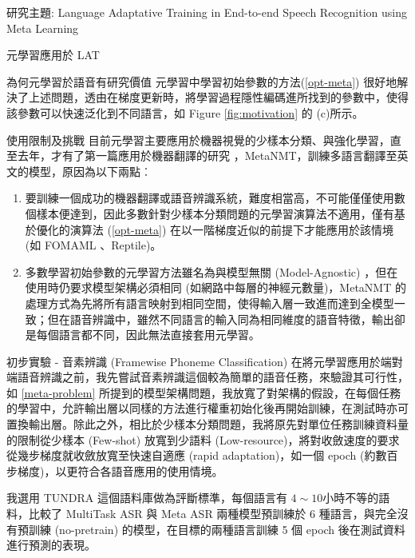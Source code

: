 \documentclass[12pt,UTF8,fntef]{article}
\begin{document}
\begin{section}{研究主題: Language Adaptative Training in End-to-end Speech Recognition using Meta Learning}
\begin{subsection}{元學習應用於 LAT}
\begin{subsubsection}{為何元學習於語音有研究價值}
      元學習中學習初始參數的方法(\ref{opt-meta}) 很好地解決了上述問題，透由在梯度更新時，將學習過程隱性編碼進所找到的參數中，使得該參數可以快速泛化到不同語言，如 Figure \ref{fig:motivation} 的 (c)所示。
    \end{subsubsection}
    \begin{subsubsection}{使用限制及挑戰} \label{meta-problem}
      目前元學習主要應用於機器視覺的少樣本分類、與強化學習，直至去年，才有了第一篇應用於機器翻譯的研究 \cite{gu2018meta}，MetaNMT，訓練多語言翻譯至英文的模型，原因為以下兩點︰
      \begin{enumerate}[itemsep=-1mm]
        \item 要訓練一個成功的機器翻譯或語音辨識系統，難度相當高，不可能僅僅使用數個樣本便達到，因此多數針對少樣本分類問題的元學習演算法不適用，僅有基於優化的演算法 (\ref{opt-meta}) 在以一階梯度近似的前提下才能應用於該情境 (如 FOMAML \cite{finn2017model}、Reptile\cite{nichol2018first})。
        \item 多數學習初始參數的元學習方法雖名為與模型無關 (Model-Agnostic) ，但在使用時仍要求模型架構必須相同 (如網路中每層的神經元數量)，MetaNMT 的處理方式為先將所有語言映射到相同空間，使得輸入層一致進而達到全模型一致；但在語音辨識中，雖然不同語言的輸入同為相同維度的語音特徵，輸出卻是每個語言都不同，因此無法直接套用元學習。
      \end{enumerate}
    \end{subsubsection}
    \begin{subsubsection}{初步實驗 - 音素辨識 (Framewise Phoneme Classification)}
      在將元學習應用於端對端語音辨識之前，我先嘗試音素辨識這個較為簡單的語音任務，來驗證其可行性，如 \ref{meta-problem} 所提到的模型架構問題，我放寬了對架構的假設，在每個任務的學習中，允許輸出層以同樣的方法進行權重初始化後再開始訓練，在測試時亦可置換輸出層。除此之外，相比於少樣本分類問題，我將原先對單位任務訓練資料量的限制從少樣本 (Few-shot) 放寬到少語料 (Low-resource)，將對收斂速度的要求從幾步梯度就收斂放寬至快速自適應 (rapid adaptation)，如一個 epoch (約數百步梯度)，以更符合各語音應用的使用情境。

      我選用 TUNDRA \cite{stan2013tundra} 這個語料庫做為評斷標準，每個語言有 $4 \sim 10$小時不等的語料，比較了 MultiTask ASR 與 Meta ASR 兩種模型預訓練於 6 種語言，與完全沒有預訓練 (no-pretrain) 的模型，在目標的兩種語言訓練 5 個 epoch 後在測試資料進行預測的表現。

    \begin{figure}[H]
    \centering
    \hspace{-5.2cm}
\end{figure}
\end{subsubsection}
\end{subsection}
\end{section}
\end{document}
